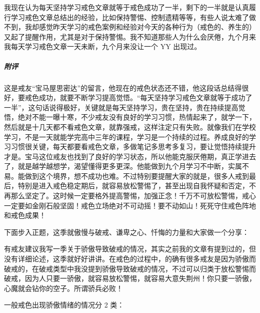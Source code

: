 \begin{case}
    我现在认为每天坚持学习戒色文章就等于戒色成功了一半，剩下的一半就是认真履行学习戒色文章总结出的经验，比如保持警惕、控制遗精等等，有些人说太难了做不到，我却感觉昨天学习的戒色案例和经验对今天的各种行为（戒色的、养生的）又起了提醒作用，尤其是对于保持警惕。我不知道那些人为什么会厌倦，九个月来我每天学习戒色文章一天未断，九个月来没让一个 YY 出现过。
    \subparagraph{附评} 这是戒友“宝马屋思密达”的留言，他现在的戒色状态还不错，他这段话总结得很好，要戒色成功，就要不断学习提高觉悟。“每天坚持学习戒色文章就等于成功了一半”，这句话说得极好，关键就是每天坚持学习，贵在坚持，贵在持续提高觉悟，绝对不能一曝十寒，不少戒友没有良好的学习习惯，热情起来了，就学一下，然后就是十几天都不看戒色文章，就靠强戒，这样注定只有失败。就像我们在学校学习，不是一天就能学完高中三年的课程，学习是一个持续的过程。养成良好的学习习惯很关键，每天都要看戒色文章，多做笔记多思考多复习，要让觉悟持续提升才是。宝马这位戒友也找到了良好的学习状态，所以他能克服厌倦期，真正学进去了，就是越学越想学，渴望懂得更多更深。他能做到九个月学习不中断，实属不易。能做到这个境界，想不成功也难。不过特别要提醒大家的就是，很多人戒到最后，特别是进入戒色稳定期后，就容易放松警惕了，甚至出现自我怀疑和否定，不再那么坚定了。这时候一定要格外提高警惕，加强正念！千万不可放松警惕，戒心一定要如金刚石般坚固！戒色立场绝对不可动摇！要不动如山！死死守住戒色阵地和戒色成果！
\end{case}

下面步入正题，这季就傲慢与破戒、谦卑之心、忏悔的力量和大家做一个分享：

有戒友建议我写一季关于骄傲导致破戒的情况，其实之前我的文章有提到过的，但没有详细论述，这季就好好讲讲。在戒色的过程中，的确有很多戒友是因为骄傲而破戒的，在破戒类型中我没提到骄傲导致破戒的情况，不过可以归类于放松警惕而破戒，因为人只要一骄傲，就容易放松警惕，就容易大意失荆州！你只要一骄傲，心魔就会钻你的空子。所谓骄兵必败！

一般戒色出现骄傲情绪的情况分 2 类：


